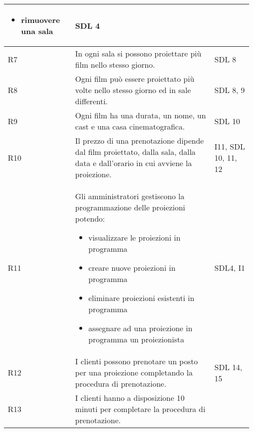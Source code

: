 \begin{longtable}{|p{0.8cm}|p{13.4cm}|p{2.1cm}|}
\begin{itemize}
            \item rimuovere una sala
      \end{itemize}                           &
      SDL 4
      \\\hline
      R7                                                                      &
      In ogni sala si possono proiettare più film nello stesso giorno.        &
      SDL 8
      \\\hline
      R8                                                                      &
      Ogni film può essere proiettato più volte nello stesso giorno ed
      in sale differenti.                                                     &
      SDL 8, 9
      \\\hline
      R9                                                                      &
      Ogni film ha una durata, un nome, un cast e una casa cinematografica.   &
      SDL 10
      \\\hline
      R10                                                                     &
      Il prezzo di una prenotazione dipende dal film proiettato, dalla
      sala, dalla data e dall'orario in cui avviene la proiezione.            &
      I11, SDL 10, 11, 12
      \\\hline
      R11                                                                     &
      Gli amministratori gestiscono la programmazione delle proiezioni
      potendo:
      \begin{itemize}
            \item visualizzare le proiezioni in programma
            \item creare nuove proiezioni in programma
            \item eliminare proiezioni esistenti in programma
            \item assegnare ad una proiezione in programma un proiezionista
      \end{itemize}         &
      SDL4, I1
      \\\hline
      R12                                                                     &
      I clienti possono prenotare un posto per una proiezione completando
      la procedura di prenotazione.                                           &
      SDL 14, 15
      \\\hline
      R13                                                                     &
      I clienti hanno a disposizione 10 minuti per completare la procedura
      di prenotazione.                                                        &

\end{longtable}
